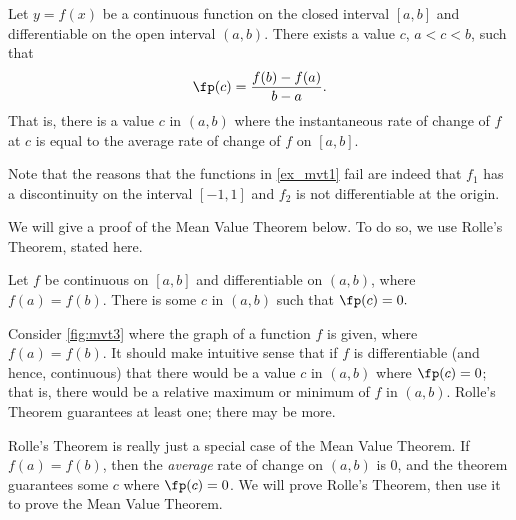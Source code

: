 {Let $y=f(x)$ be a continuous function on the closed interval $[a,b]$ and differentiable on the open interval $(a,b)$. There exists a value $c$, $a < c < b$, such that 
\[\fp(c) = \frac{f(b)-f(a)}{b-a}.\]
That is, there is a value $c$ in $(a,b)$ where the instantaneous rate of change of $f$ at $c$ is equal to the average rate of change of $f$ on $[a,b]$.}

Note that the reasons that the functions in \autoref{ex_mvt1} fail are indeed that $f_1$ has a discontinuity on the interval $[-1,1]$ and $f_2$ is not differentiable at the origin.\bigskip

We will give a proof of the Mean Value Theorem below. To do so, we use Rolle's Theorem, stated here.

{Let $f$ be continuous on $[a,b]$ and differentiable on $(a,b)$, where $f(a) = f(b)$. There is some $c$ in $(a,b)$ such that $\fp(c) = 0.$}


Consider \autoref{fig:mvt3} where the graph of a function $f$ is given, where $f(a) = f(b)$. It should make intuitive sense that if $f$ is differentiable (and hence, continuous) that there would be a value $c$ in $(a,b)$ where $\fp(c)=0$; that is, there would be a relative maximum or minimum of $f$ in $(a,b)$. Rolle's Theorem guarantees at least one; there may be more. 

Rolle's Theorem is really just a special case of the Mean Value Theorem. If $f(a) = f(b)$, then the \textit{average} rate of change on $(a,b)$ is $0$, and the theorem guarantees some $c$ where $\fp(c)=0$. We will prove Rolle's Theorem, then use it to prove the Mean Value Theorem.

